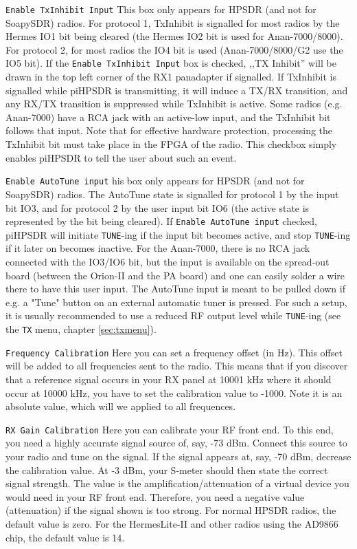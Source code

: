 \documentclass[12pt]{book}
\def\rett#1{\texttt{\color{red}#1}}
\def\bltt#1{\texttt{\color{blue}#1}}
\begin{document}
\rett{Enable TxInhibit Input} This box only appears for HPSDR (and not for SoapySDR)
radios.  
For  protocol 1, TxInhibit is signalled for most radios by the Hermes IO1 bit being
cleared (the Hermes IO2 bit is used for Anan-7000/8000). For protocol 2, for most
radios the IO4 bit is used (Anan-7000/8000/G2 use the IO5 bit). 
If the \rett{Enable TxInhibit Input} box is checked, ,,TX Inhibit'' will be drawn
in the top left corner of the RX1 panadapter if signalled. If TxInhibit is signalled
while piHPSDR is transmitting, it will induce a TX/RX transition, and any RX/TX
transition is suppressed while TxInhibit is active. Some radios (e.g. Anan-7000) have
a RCA jack with an active-low input, and the TxInhibit bit follows that input.
Note that for effective hardware protection, processing the TxInhibit bit must
take place in the FPGA of the radio. This checkbox simply enables piHPSDR to tell
the user about such an event.

\rett{Enable AutoTune  input} his box only appears for HPSDR (and not for SoapySDR)
radios. The AutoTune state is signalled for protocol 1 by the input bit IO3,
and for protocol 2 by the user input bit IO6 (the active state is represented
by the bit being cleared).
If \rett{Enable AutoTune  input} checked, piHPSDR will initiate \bltt{TUNE}-ing if the
input bit becomes active, and stop \bltt{TUNE}-ing if it later on becomes inactive.
For the Anan-7000, there is no RCA jack connected with the IO3/IO6 bit, but the
input is available on the spread-out board (between the Orion-II and the PA board) and one
can easily solder a wire there to have this user input. The AutoTune input is meant to
be pulled down if e.g. a "Tune" button on an external automatic tuner is pressed.
For such a setup, it is usually recommended to use a reduced RF output level while
\bltt{TUNE}-ing  (see the \bltt{TX} menu, chapter \ref{sec:txmenu}). 


\rett{Frequency Calibration} Here you can set a frequency offset (in Hz). This offset
will be added to all frequencies sent to the radio. This means that if you discover that
a reference signal occurs in your RX panel at 10001 kHz where it should occur at 10000
kHz, you have to set the calibration value to -1000. Note it is an absolute value,
which will we applied to all frequences.

\rett{RX Gain Calibration} Here you can calibrate your RF front end. To this end, you
need a highly accurate signal source of, say, -73 dBm. Connect this source to your
radio and tune on the signal. If the signal appears at, say, -70 dBm, decrease the
calibration value. At -3 dBm, your S-meter should then state the correct signal
strength. The value is the  amplification/attenuation of  a virtual device you
would need in your RF front end. Therefore, you need a negative value (attenuation)
if the signal shown is too strong. For normal HPSDR radios, the default value is
 zero. For the HermesLite-II and other radios using the AD9866 chip, the default
 value is 14.
\end{document}
